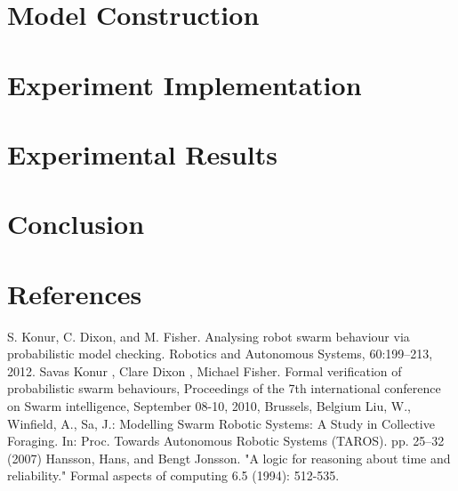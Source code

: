 \documentclass[11pt]{article}
\theoremstyle{definition}
\begin{document}
\section{Model Construction}\label{sec:model}

\section{Experiment Implementation}\label{sec:implementation}

\section{Experimental Results}\label{sec:results}

\section{Conclusion}\label{sec:conclusion}

\section{References}

\begin{thebibliography}{99}
        S. Konur, C. Dixon, and M. Fisher.
        Analysing robot swarm behaviour via
        probabilistic model checking.
        Robotics and Autonomous Systems, 60:199–213,
        2012.
        Savas Konur , Clare Dixon , Michael Fisher.
        Formal verification of probabilistic swarm behaviours,
        Proceedings of the 7th international conference on Swarm intelligence,
        September 08-10, 2010, Brussels, Belgium
        Liu, W., Winfield, A., Sa, J.: Modelling Swarm Robotic Systems: A Study in Collective
        Foraging. In: Proc. Towards Autonomous Robotic Systems (TAROS). pp. 25–32 (2007)
        Hansson, Hans, and Bengt Jonsson. "A logic for reasoning about time and reliability." Formal aspects of computing 6.5 (1994): 512-535.
\end{thebibliography}
\end{document}
